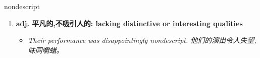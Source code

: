 
\begin{frame}
{\huge nondescript}
\begin{center}
\begin{enumerate}\Large
  \item \textbf{adj. 平凡的,不吸引人的: lacking distinctive or interesting qualities}
  \begin{itemize}
    \item \em{\Large{Their performance was disappointingly nondescript. 他们的演出令人失望,味同嚼蜡。}}
  \end{itemize}
\end{enumerate}
\end{center}
\end{frame}

